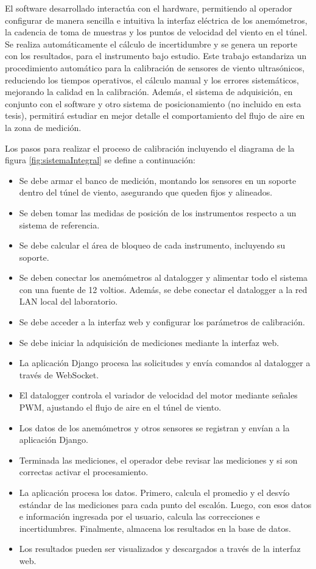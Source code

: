 El software desarrollado interactúa con el hardware, permitiendo al operador configurar de manera sencilla e intuitiva la interfaz eléctrica de los anemómetros, la cadencia de toma de muestras y los puntos de velocidad del viento en el túnel. Se realiza automáticamente el cálculo de incertidumbre y se genera un reporte con los resultados, para el instrumento bajo estudio. Este trabajo estandariza un procedimiento automático para la calibración de sensores de viento ultrasónicos, reduciendo los tiempos operativos, el cálculo manual y los errores sistemáticos, mejorando la calidad en la calibración. Además, el sistema de adquisición, en conjunto con el software y otro sistema de posicionamiento (no incluido en esta tesis), permitirá estudiar en mejor detalle el comportamiento del flujo de aire en la zona de medición.

Los pasos para realizar el proceso de calibración incluyendo el diagrama de la figura \ref{fig:sistemaIntegral} se define a continuación:
\begin{itemize}
    \item Se debe armar el banco de medición, montando los sensores en un soporte dentro del túnel de viento, asegurando que queden fijos y alineados.
    \item Se deben tomar las medidas de posición de los instrumentos respecto a un sistema de referencia.
    \item Se debe calcular el área de bloqueo de cada instrumento, incluyendo su soporte.
    \item Se deben conectar los anemómetros al datalogger y alimentar todo el sistema con una fuente de 12 voltios. Además, se debe conectar el datalogger a la red LAN local del laboratorio.
    \item Se debe acceder a la interfaz web y configurar los parámetros de calibración.
    \item Se debe iniciar la adquisición de mediciones mediante la interfaz web.
    \item La aplicación Django procesa las solicitudes y envía comandos al datalogger a través de WebSocket.
    \item El datalogger controla el variador de velocidad del motor mediante señales PWM, ajustando el flujo de aire en el túnel de viento.
    \item Los datos de los anemómetros y otros sensores se registran y envían a la aplicación Django.
    \item Terminada las mediciones, el operador debe revisar las mediciones y si son correctas activar el procesamiento.
    \item La aplicación procesa los datos. Primero, calcula el promedio y el desvío estándar de las mediciones para cada punto del escalón. Luego, con esos datos e información ingresada por el usuario, calcula las correcciones e incertidumbres. Finalmente, almacena los resultados en la base de datos.
    \item Los resultados pueden ser visualizados y descargados a través de la interfaz web.
\end{itemize}

